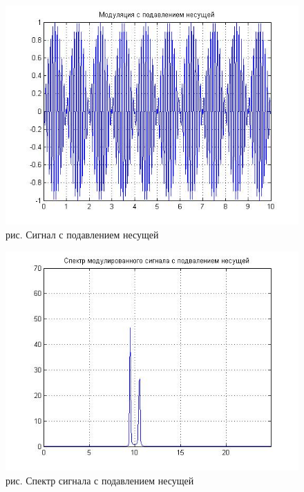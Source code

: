 \documentclass[10pt,a4paper]{report}
\begin{document}
\begin{figure}
\begin{center}
\includegraphics[angle=0, scale = 0.9]{7_5.jpg}\newline
рис. Сигнал с подавлением несущей\newline
\end{center}
\end{figure}
\begin{figure}
\begin{center}
\includegraphics[angle=0, scale = 0.9]{7_6.jpg}\newline
рис. Спектр сигнала с подавлением несущей\newline
\end{center}
\end{figure}
\end{document}
